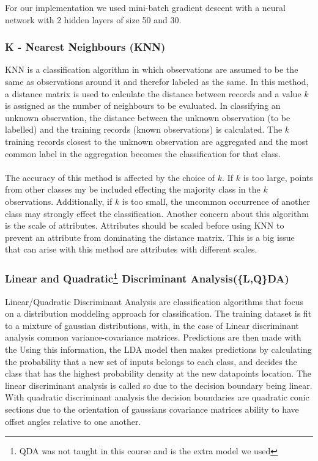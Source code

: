 \documentclass{article}
\begin{document}
\begin{multicols}{2}
For our implementation we used mini-batch gradient descent with a neural network with 2 hidden layers of size 50 and 30.

\subsubsection{K - Nearest Neighbours (KNN)}
KNN is a classification algorithm in which observations are assumed to be the same as observations around it and therefor labeled as the same. In this method, a distance matrix is used to calculate the distance between records and a value $k$ is assigned as the number of neighbours to be evaluated\cite{KNN}. In classifying an unknown observation, the distance between the unknown observation (to be labelled) and the training records (known observations) is calculated. The $k$ training records closest to the unknown observation are aggregated and the most common label in the aggregation becomes the classification for that class.
\\\\
The accuracy of this method is affected by the choice of $k$. If $k$ is too large, points from other classes my be included effecting the majority class in the $k$ observations. Additionally, if $k$ is too small, the uncommon occurrence of another class may strongly effect the classification. Another concern about this algorithm is the scale of attributes. Attributes should be scaled before using KNN to prevent an attribute from dominating the distance matrix. This is a big issue that can arise with this method are attributes with different scales.

\subsubsection{Linear and Quadratic\footnote{QDA was not taught in this course and is the extra model we used} Discriminant Analysis(\{L,Q\}DA)}
Linear/Quadratic Discriminant Analysis are classification algorithms that focus on a distribution moddeling approach for classification.
The training dataset is fit to a mixture of gaussian distributions, with, in the case of Linear discriminant analysis common variance-covariance matrices.
Predictions are then made with the 
Using this information, the LDA model then makes predictions by calculating the probability that a new set of inputs belongs to each class, and decides the class that has the highest probability density at the new datapoints location.
The linear discriminant analysis is called so due to the decision boundary being linear.
With quadratic discriminant analysis the decision boundaries are quadratic conic sections due to the orientation of gaussians covariance matrices ability to have offset angles relative to one another.

\end{multicols}
\end{document}
